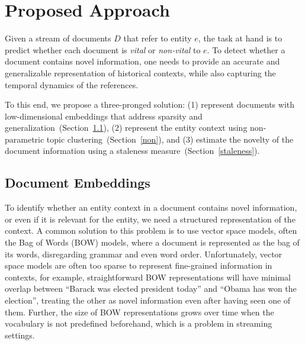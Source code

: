 \documentclass{article}
\begin{document}
\section{Proposed Approach}
\label{approach}

Given a stream of documents $D$ that refer to entity $e$, the task at hand is to predict whether each document is \emph{vital} or \emph{non-vital} to $e$. 
To detect whether a document contains novel information, one needs to provide an accurate and generalizable representation of historical contexts, while also capturing the temporal dynamics of the references.

To this end, we propose a three-pronged solution:
(1) represent documents with low-dimensional embeddings that address sparsity and generalization~(Section~\ref{docwordemb}), 
(2) represent the entity context using non-parametric topic clustering~(Section~\ref{non}), and 
(3) estimate the novelty of the document information using a staleness measure~(Section~\ref{staleness}).


\subsection{Document Embeddings}
\label{docwordemb}

To identify whether an entity context in a document contains novel information, or even if it is relevant for the entity, we need a structured representation of the context. %
A common solution to this problem is to use vector space models, often the Bag of Words (BOW) models, where a document is represented as the bag of its words, disregarding grammar and even word order. 
Unfortunately, vector space models are often too sparse to represent fine-grained information in contexts, for example, straightforward BOW representations will have minimal overlap between ``Barack was elected president today'' and ``Obama has won the election'', treating the other as novel information even after having seen one of them.
Further, the size of BOW representations grows over time when the vocabulary is not predefined beforehand, which is a problem in streaming settings.
\end{document}
